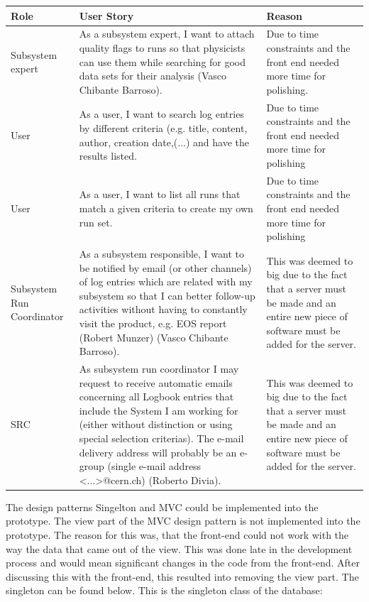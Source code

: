 \documentclass[paper=a4, fontsize=11pt,twoside]{scrartcl}	%
\begin{document}
\begin{longtable}{ | p{3cm} | p{7cm} | p{3cm}|}
\hline
Role & User Story & Reason \\ \hline
Subsystem expert & As a subsystem expert, I want to attach quality flags to runs so that physicists can use them while searching for good data sets for their analysis (Vasco Chibante Barroso).& Due to time constraints and the front end needed more time for polishing. \\ \hline
User & As a user, I want to search log entries by different criteria (e.g. title, content, author, creation date,(...) and have the results listed. & Due to time constraints and the front end needed more time for polishing \\ \hline
User &  As a user, I want to list all runs that match a given criteria to create my own run set.& Due to time constraints and the front end needed more time for polishing \\ \hline
Subsystem Run Coordinator &  As a subsystem responsible, I want to be notified by email (or other channels) of log entries which are related with my subsystem so that I can better follow-up activities without having to constantly visit the product, e.g. EOS report (Robert Munzer) (Vasco Chibante Barroso). & This was deemed to big due to the fact that a server must be made and an entire new piece of software must be added for the server. \\ \hline
SRC & As subsystem run coordinator I may request to receive automatic emails concerning all Logbook entries that include the System I am working for (either without distinction or using special selection criterias). The e-mail delivery address will probably be an e-group (single e-mail address <...>@cern.ch) (Roberto Divia). & This was deemed to big due to the fact that a server must be made and an entire new piece of software must be added for the server. \\ \hline
\end{longtable}
The design patterns Singelton and MVC could be implemented into the prototype. The view part of the MVC design pattern is not implemented into the prototype. The reason for this was, that the front-end could not work with the way the data that came out of the view. This was done late in the development process and would mean significant changes in the code from the front-end. After discussing this with the front-end, this resulted into removing the view part. The singleton can be found below. This is the singleton class of the database:
\end{document}
